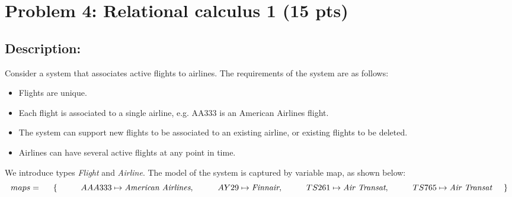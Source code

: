\section{Problem 4: Relational calculus 1 (15 pts)}

\subsection{Description:}

\noindent Consider a system that associates active flights to airlines. The requirements of the system
are as follows:

\begin{itemize}
  \item Flights are unique.
  \item Each flight is associated to a single airline, e.g. AA333 is an American Airlines flight.
  \item The system can support new flights to be associated to an existing airline, or existing flights to be deleted.
  \item Airlines can have several active flights at any point in time.
\end{itemize}

\noindent We introduce types \emph{Flight} and \emph{Airline}. The model of the system is captured by variable
map, as shown below:\\

\[
maps = \\
\hspace{5mm} \{ \\
\hspace{10mm} AAA333 \mapsto \emph{American Airlines},\\
\hspace{10mm} AY29 \mapsto \emph{Finnair},\\
\hspace{10mm} TS261 \mapsto \emph{Air Transat},\\
\hspace{10mm} TS765 \mapsto \emph{Air Transat}\\
\hspace{5mm} \}
\]

